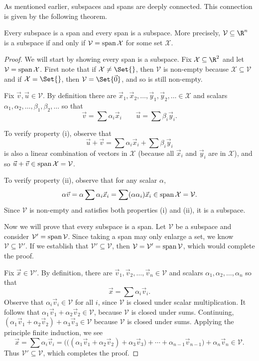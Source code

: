 As mentioned earlier, subspaces and spans are deeply connected.
This connection is given by the following theorem.

\begin{theorem}
	Every subspace is a span and every span is a subspace.  More precisely,
	$\mathcal V\subseteq \R^n$ is a subspace if and only if $\mathcal V=
	\operatorname{span}\mathcal X$ for some set $\mathcal X$.
\end{theorem}
\begin{proof}
	We will start by showing every span is a subspace.  Fix $\mathcal X\subseteq\R^2$
	and let
	$\mathcal V=\operatorname{span}\mathcal X$. First note that if $\mathcal X\neq \Set{}$, then $\mathcal V$
	is non-empty because $\mathcal X\subseteq\mathcal V$ and if $\mathcal X=\Set{}$, then $\mathcal V=\Set{\vec 0}$,
	and so is still non-empty.
	
	Fix $\vec v,\vec u\in\mathcal V$. By definition there are $\vec x_1,\vec x_2,\ldots,\vec y_1,\vec y_2,\ldots\in\mathcal X$ 
	and scalars $\alpha_1,\alpha_2,\ldots,\beta_1,\beta_2,\ldots$ so that
	\[
		\vec v=\sum \alpha_i\vec x_i\qquad \vec u=\sum\beta_i\vec y_i.
	\]

	To verify property (i), observe that
	\[
		\vec u+\vec v=\sum\alpha_i\vec x_i + \sum\beta_i\vec y_i
	\]
	is also a linear combination of vectors in $\mathcal X$ (because all $\vec x_i$ and $\vec y_i$
	are in $\mathcal X$), and so $\vec u+\vec v\in	\operatorname{span}\mathcal X=\mathcal V$.
	
	To verify property (ii), observe that for any scalar $\alpha$, 
	\[
		\alpha\vec v=\alpha\sum \alpha_i\vec x_i = \sum (\alpha\alpha_i)\vec x_i\in
		\operatorname{span}\mathcal X=\mathcal V.
	\]
	Since $\mathcal V$ is non-empty and satisfies both properties (i) and (ii), it is a subspace.

	Now we will prove that every subspace is a span. Let $\mathcal V$ be a subspace
	and consider $\mathcal V'=\operatorname{span}\mathcal V$.  Since taking a span may only enlarge a set, we know
	$\mathcal V\subseteq \mathcal V'$. If we establish that $\mathcal V'\subseteq\mathcal V$,
	then $\mathcal V=\mathcal V'=\operatorname{span}\mathcal V$, which would complete the proof.

	Fix $\vec x\in\mathcal V'$. By definition, there are $\vec v_1,\vec v_2,\ldots,\vec v_n\in\mathcal V$ and scalars
	$\alpha_1,\alpha_2,\ldots,\alpha_n$ so that
	\[
		\vec x=\sum \alpha_i\vec v_i.
	\]
	Observe that 
	$\alpha_i\vec v_i\in\mathcal V$ for all $i$, since $\mathcal V$ is closed under scalar
	multiplication. It follows that $\alpha_1\vec v_1+\alpha_2\vec v_2\in\mathcal V$,
	because $\mathcal V$ is closed under sums. Continuing, 
	$(\alpha_1\vec v_1+\alpha_2\vec v_2)+\alpha_3\vec v_3\in\mathcal V$ because
	$\mathcal V$ is closed under sums. Applying the principle finite induction, we see
	\[
		\vec x=\sum \alpha_i\vec v_i
		=\Big(\big((\alpha_1\vec v_1+\alpha_2\vec v_2)
		+\alpha_3\vec v_3\big)+\cdots+\alpha_{n-1}\vec v_{n-1} \Big)
		+\alpha_n\vec v_n\in\mathcal V.
	\]
	Thus $\mathcal V'\subseteq\mathcal V$, which completes the proof.
\end{proof}

